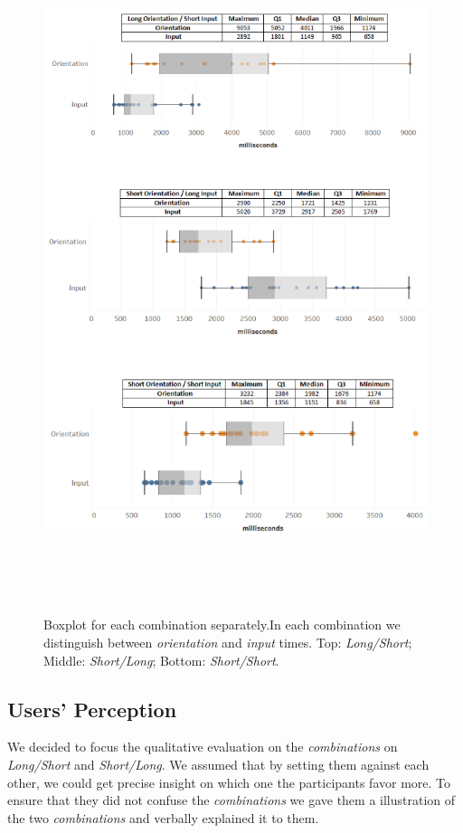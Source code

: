 \begin{figure}[t!]
\centering
\includegraphics[width=14cm, height=20cm]{Chapters/graphics/Times.png}
\caption{Boxplot for each combination separately.In each combination we distinguish between \textit{orientation} and \textit{input} times. Top: \textit{Long/Short}; Middle: \textit{Short/Long}; Bottom: \textit{Short/Short}.}
\label{fig:times}
\end{figure}

\subsection{Users' Perception}

We decided to focus the qualitative evaluation on the \textit{combinations} on \textit{Long/Short} and \textit{Short/Long}. We assumed that by setting them against each other, we could get precise insight on which one the participants favor more. To ensure that they did not confuse the \textit{combinations} we gave them a illustration of the two \textit{combinations} and verbally explained it to them.

